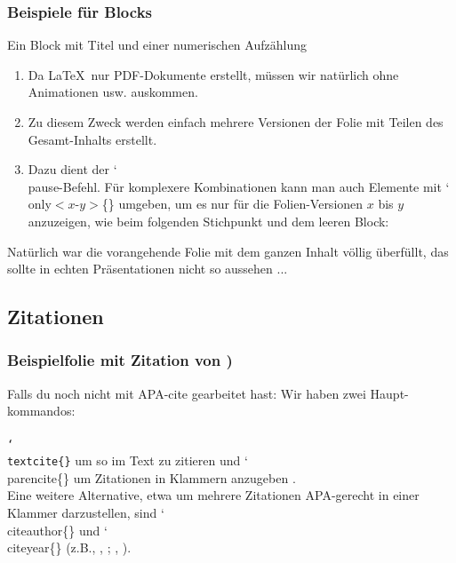 \documentclass{beamer}
\begin{document}
\begin{frame}
\frametitle{Beispiele für Blocks}


\begin{block}{Ein Block mit Titel und einer numerischen Aufzählung}
\begin{enumerate}
\item Da \LaTeX\ nur PDF-Dokumente erstellt, müssen wir natürlich ohne Animationen usw. auskommen.
\pause
\item Zu diesem Zweck werden einfach mehrere Versionen der Folie mit Teilen des Gesamt-Inhalts erstellt.
\pause
\item Dazu dient der \char`\\pause-Befehl. Für komplexere Kombinationen kann man auch Elemente mit \char`\\only$<$$x$-$y$$>$\{\} umgeben, um es nur für die Folien-Versionen $x$ bis $y$ anzuzeigen, wie beim folgenden Stichpunkt und dem leeren Block:
\end{enumerate}
\end{block}
\end{frame}

\begin{frame}
Natürlich war die vorangehende Folie mit dem ganzen Inhalt völlig überfüllt, das sollte in echten Präsentationen nicht so aussehen ...
\end{frame}

\subsection{Zitationen}

\begin{frame}
\frametitle{Beispielfolie mit Zitation von \textcite{Frankl1996})}
Falls du noch nicht mit APA-cite gearbeitet hast: Wir haben zwei Haupt-kommandos:\\
\ \\
\texttt{\char`\\textcite\{\}} um so \textcite{Frankl1996} im Text zu zitieren und \char`\\parencite\{\} um Zitationen in Klammern anzugeben \parencite{Frankl1996}.\\
Eine weitere Alternative, etwa um mehrere Zitationen APA-gerecht in einer Klammer darzustellen, sind \char`\\citeauthor\{\} und \char`\\citeyear\{\} (z.B., \citeauthor{Frankl1996}, \citeyear{Frankl1996}; \citeauthor{Frankl2015}, \citeyear{Frankl2015}). 
\end{frame}

\begin{frame}
\printbibliography
\end{frame}
\end{document}
